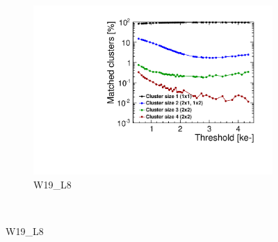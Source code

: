 \begin{figure}[htbp]
\begin{subfigure}[b]{0.33\textwidth}
    \includegraphics[width=\textwidth]{./figures/TestBeam/cluSize_THLscan_W0019_L08.pdf}
    \caption{W19\_L8}
  \end{subfigure} \\


\end{figure}
